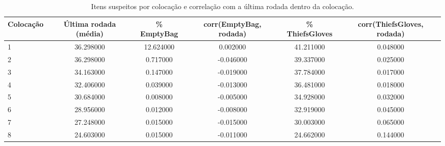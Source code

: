 \begin{table}[htbp]
\caption{Itens suspeitos por colocação e correlação com a última rodada dentro da colocação.}
\label{tab:audcol}
\centering
\small
\begin{tabular}{lccccc}
\toprule
Colocação & Última rodada (média) & \% EmptyBag & corr(EmptyBag, rodada) & \% ThiefsGloves & corr(ThiefsGloves, rodada) \\
\midrule
1 & 36.298000 & 12.624000 & 0.002000 & 41.211000 & 0.048000 \\
2 & 36.298000 & 0.717000 & -0.046000 & 39.337000 & 0.025000 \\
3 & 34.163000 & 0.147000 & -0.019000 & 37.784000 & 0.017000 \\
4 & 32.406000 & 0.039000 & -0.013000 & 36.481000 & 0.018000 \\
5 & 30.684000 & 0.008000 & -0.005000 & 34.928000 & 0.032000 \\
6 & 28.956000 & 0.012000 & -0.008000 & 32.919000 & 0.045000 \\
7 & 27.248000 & 0.015000 & -0.015000 & 30.003000 & 0.065000 \\
8 & 24.603000 & 0.015000 & -0.011000 & 24.662000 & 0.144000 \\
\bottomrule
\end{tabular}
\end{table}
